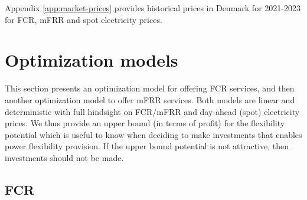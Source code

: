 \documentclass[sigconf]{acmart}
\begin{document}
Appendix \ref{app:market-prices} provides historical prices in Denmark for 2021-2023 for FCR, mFRR and spot electricity prices.


\section{Optimization models}
This section presents an optimization model for offering FCR services, and then another optimization model to offer mFRR services. 
Both models are linear and deterministic with full hindsight on FCR/mFRR and day-ahead (spot) electricity prices. We thus provide an upper bound (in terms of profit) for the flexibility potential which is useful to know when deciding to make investments that enables power flexibility provision. If the upper bound potential is not attractive, then investments should not be made.

\subsection{FCR}
\end{document}
